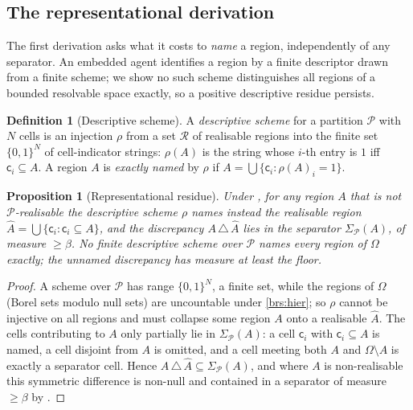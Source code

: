 \documentclass[11pt,a4paper]{article}
\theoremstyle{thmstyle}
\newtheorem{proposition}[theorem]{Proposition}
\theoremstyle{definition}
\newtheorem{definition}[theorem]{Definition}
\theoremstyle{remark}
\newcommand{\Space}{\Omega}
\newcommand{\thick}{\beta}
\newcommand{\Part}{\mathscr{P}}
\newcommand{\cell}{\mathsf{c}}
\begin{document}
\subsection{The representational derivation}

The first derivation asks what it costs to \emph{name} a region, independently of
any separator. An embedded agent identifies a region by a finite descriptor
drawn from a finite scheme; we show no such scheme distinguishes all regions of
a bounded resolvable space exactly, so a positive descriptive residue persists.

\begin{definition}[Descriptive scheme]
\label{def:scheme}
A \emph{descriptive scheme} for a partition $\Part$ with $N$ cells is an
injection $\rho$ from a set $\mathcal{R}$ of realisable regions into the finite
set $\{0,1\}^{N}$ of cell-indicator strings: $\rho(A)$ is the string whose
$i$-th entry is $1$ iff $\cell_i\subseteq A$. A region $A$ is
\emph{exactly named} by $\rho$ if $A=\bigcup\{\cell_i:\rho(A)_i=1\}$.
\end{definition}

\begin{proposition}[Representational residue]
\label{prop:rep-residue}
Under , for any region $A$ that is not $\Part$-realisable the
descriptive scheme $\rho$ names instead the realisable region
$\widehat A=\bigcup\{\cell_i:\cell_i\subseteq A\}$, and the discrepancy
$A\,\triangle\,\widehat A$ lies in the separator $\Sigma_\Part(A)$, of measure
$\ge\thick$. No finite descriptive scheme over $\Part$ names every region of
$\Space$ exactly; the unnamed discrepancy has measure at least the floor.
\end{proposition}

\begin{proof}
A scheme over $\Part$ has range $\{0,1\}^N$, a finite set, while the regions of
$\Space$ (Borel sets modulo null sets) are uncountable under \ref{brs:hier}; so
$\rho$ cannot be injective on all regions and must collapse some region $A$ onto
a realisable $\widehat A$. The cells contributing to $A$ only partially lie in
$\Sigma_\Part(A)$: a cell $\cell_i$ with $\cell_i\subseteq A$ is named, a cell
disjoint from $A$ is omitted, and a cell meeting both $A$ and $\Space\setminus A$
is exactly a separator cell. Hence $A\,\triangle\,\widehat A\subseteq
\Sigma_\Part(A)$, and where $A$ is non-realisable this symmetric difference is
non-null and contained in a separator of measure $\ge\thick$ by
.
\end{proof}
\end{document}
